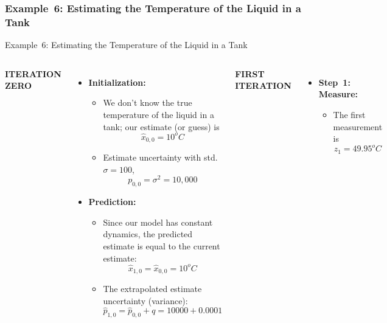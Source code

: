 \subsubsection{Example~6: Estimating the Temperature of the Liquid in a Tank} 
\begin{frame}{Example~6: Estimating the Temperature of the Liquid in a Tank} 
\begin{columns}
       \textbf{ITERATION ZERO}
    \begin{itemize}
        \item \textbf{Initialization:}
        \begin{itemize}
            \item We don't know the true temperature of the liquid in a tank; our estimate (or guess) is
            $$\hat{x}_{0,0} = 10^o C$$
            \item Estimate uncertainty with std. $\sigma = 100$,
            $$p_{0,0} = \sigma^2 = 10,000$$
        \end{itemize}
        \item \textbf{Prediction:}
            \begin{itemize}
                \item Since our model has constant dynamics, the predicted estimate is equal to the current estimate:
                $$\hat{x}_{1,0}= \hat{x}_{0,0} = 10^oC$$
                \item The extrapolated estimate uncertainty (variance):
                $$\hat{p}_{1,0}= \hat{p}_{0,0} + q = 10000 + 0.0001$$
            \end{itemize}
    \end{itemize}
        \textbf{FIRST ITERATION}
    \begin{itemize}
        \item \textbf{Step~1: Measure:}
            \begin{itemize}
                \item The first measurement is
                $$z_1 = 49.95^oC$$
                

\end{itemize}
\end{itemize}
\end{columns}
\end{frame}
